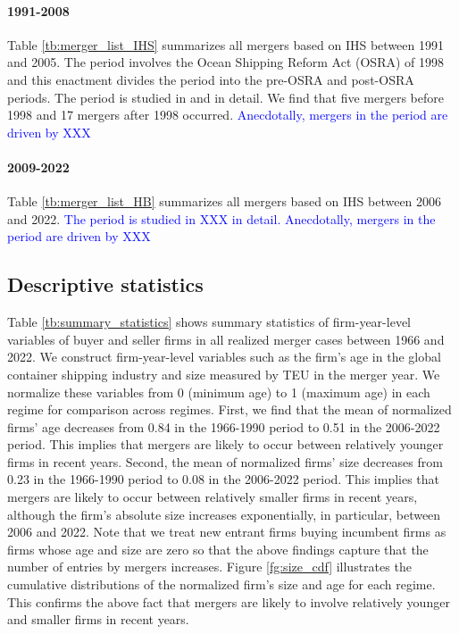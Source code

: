 \documentclass[10pt]{article}
\begin{document}
\paragraph{1991-2008}

Table \ref{tb:merger_list_IHS} summarizes all mergers based on IHS between 1991 and 2005.
The period involves the Ocean Shipping Reform Act (OSRA) of 1998 and this enactment divides the period into the pre-OSRA and post-OSRA periods. 
The period is studied in \cite{fusillo2006some,fusillo2013stability} and \cite{reitzes2002rolling} in detail.
We find that five mergers before 1998 and 17 mergers after 1998 occurred.
\textcolor{blue}{Anecdotally, mergers in the period are driven by XXX}




\paragraph{2009-2022}

Table \ref{tb:merger_list_HB} summarizes all mergers based on IHS between 2006 and 2022.
\textcolor{blue}{The period is studied in XXX in detail. Anecdotally, mergers in the period are driven by XXX}





\subsection{Descriptive statistics}\label{sec:descriptive_statistics}

Table \ref{tb:summary_statistics} shows summary statistics of firm-year-level variables of buyer and seller firms in all realized merger cases between 1966 and 2022. 
We construct firm-year-level variables such as the firm's age in the global container shipping industry and size measured by TEU in the merger year. 
We normalize these variables from 0 (minimum age) to 1 (maximum age) in each regime for comparison across regimes.
First, we find that the mean of normalized firms' age decreases from 0.84 in the 1966-1990 period to 0.51 in the 2006-2022 period. 
This implies that mergers are likely to occur between relatively younger firms in recent years.
Second, the mean of normalized firms' size decreases from 0.23 in the 1966-1990 period to 0.08 in the 2006-2022 period. 
This implies that mergers are likely to occur between relatively smaller firms in recent years, although the firm's absolute size increases exponentially, in particular, between 2006 and 2022. 
Note that we treat new entrant firms buying incumbent firms as firms whose age and size are zero so that the above findings capture that the number of entries by mergers increases.
Figure \ref{fg:size_cdf} illustrates the cumulative distributions of the normalized firm's size and age for each regime. 
This confirms the above fact that mergers are likely to involve relatively younger and smaller firms in recent years.
\end{document}
